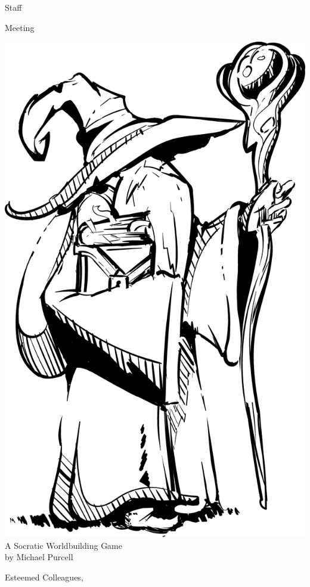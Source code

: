 \documentclass[a6paper, 11pt, parskip=half]{scrartcl}
\begin{document}
\begin{titlepage}
\enlargethispage{4.75\baselineskip}
\setmainfont[Scale=3.25]{Magic School One}
\Huge
\begin{center}
\vspace*{-1.0\baselineskip}
Staff

Meeting

\vfill
\includegraphics[scale=0.033]{Images/wizard_with_staff.png}
\vfill
\huge
\setmainfont{Bilbo Swash Caps}
A Socratic Worldbuilding Game\\
\setmainfont{Bilbo Swash Caps}
by Michael Purcell
\end{center}
\end{titlepage}
\thispagestyle{empty}
\enlargethispage{3.5\baselineskip}
\setmainfont{Bilbo Swash Caps}
\large
\noindent Esteemed Colleagues,
\end{document}
